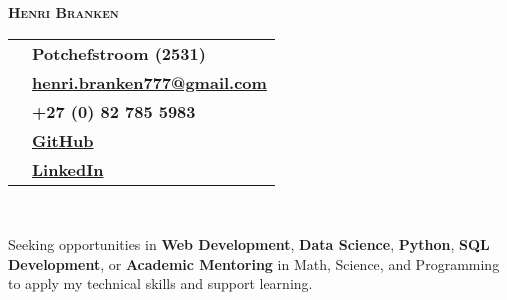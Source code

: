 \documentclass[a4paper,10pt]{article}
\begin{document}
\begin{center}
	{\Huge\textbf{\textsc{\textcolor{burnt}{Henri Branken}}}}\\[0.5cm]
\end{center}
\begin{minipage}{0.5\textwidth}
	\begin{tcolorbox}[
		colback=teal!10, %
		colframe=teal,   %
		boxrule=1pt, %
		width=0.8\textwidth,
		left=10pt, right=10pt, %
		sharp corners=northwest
		]
		\begin{tabularx}{\textwidth}{c X}
			\faHome & \textbf{Potchefstroom (2531)} \\[0.2cm]
			\faEnvelope & \href{mailto:henri.branken777@gmail.com}{\textbf{henri.branken777@gmail.com}} \\[0.2cm]
			\faPhone & \textbf{+27 (0) 82 785 5983} \\[0.2cm]
			\faGithub & \href{https://github.com/HenriBranken}{\textbf{GitHub}} \\[0.2cm]
			\faLinkedin & \href{https://www.linkedin.com/in/henri-branken-1423a2153/}{\textbf{LinkedIn}}
		\end{tabularx}
	\end{tcolorbox}
\end{minipage}
\hfill
\begin{minipage}{0.3\textwidth}
\end{minipage}\\[0.5cm]

\begin{tcolorbox}[
	colback=burntshade,    %
	colframe=burnt,     %
	boxrule=1pt,        %
	sharp corners=northwest,
	rounded corners=southwest,
	coltitle=white,     %
	fonttitle=\large\bfseries\scshape,  %
	title=Career Objective,
	width=\textwidth,   %
	left=10pt, right=10pt, top=5pt, bottom=5pt  %
	]
	Seeking opportunities in \textbf{Web Development}, \textbf{Data Science}, \textbf{Python}, \textbf{SQL Development}, or \textbf{Academic Mentoring} in Math, Science, and Programming to apply my technical skills and support learning.
\end{tcolorbox}
\end{document}
